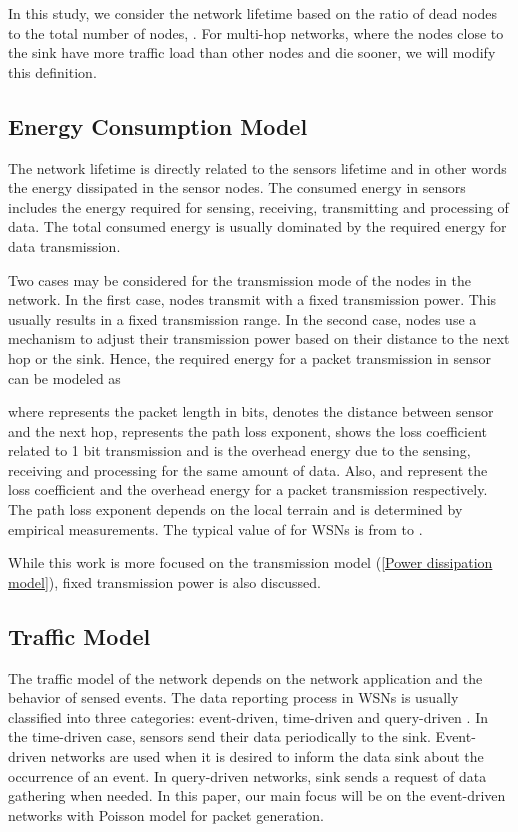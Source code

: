 \documentclass[conference]{IEEEtran}
\begin{document}
In this study, we consider the network lifetime based on the ratio
of dead nodes to the total number of nodes, . For multi-hop
networks, where the nodes close to the sink have more traffic load
than other nodes and die sooner, we will modify this definition.

\subsection{Energy Consumption Model}
The network lifetime is directly related to the sensors lifetime
and in other words the energy dissipated in the sensor nodes. The
consumed energy in sensors includes the energy required for sensing,
receiving, transmitting and processing of data. The total consumed
energy is usually dominated by the required energy for data
transmission.

Two cases may be considered for the transmission mode of the nodes
in the network. In the first case, nodes transmit with a fixed
transmission power. This usually results in a fixed transmission
range. In the second case, nodes use a mechanism to adjust their
transmission power based on their distance to the next hop or the
sink. Hence, the required energy for a packet transmission in sensor
 can be modeled as \cite{Hein_Tranmission_model_2000}

where  represents the packet length in bits,  denotes the
distance between sensor  and the next hop,  represents
the path loss exponent,  shows the loss coefficient related to
1 bit transmission and  is the overhead energy due to the
sensing, receiving and processing for the same amount of data. Also,
 and  represent the loss coefficient and the
overhead energy for a packet transmission respectively. The path
loss exponent depends on the local terrain and is determined by
empirical measurements. The typical value of  for WSNs is
from  to  \cite{Oym_ICC_2004}.

While this work is more focused on the transmission model
(\ref{Power dissipation model}), fixed transmission power is also
discussed.

\subsection{Traffic Model}
The traffic model of the network depends on the network application
and the behavior of sensed events. The data reporting process in
WSNs is usually classified into three categories: event-driven,
time-driven and query-driven \cite{Al-Karaki_Routing_Magazine2004}.
In the time-driven case, sensors send their data periodically to the
sink. Event-driven networks are used when it is desired to inform
the data sink about the occurrence of an event. In query-driven
networks, sink sends a request of data gathering when needed. In
this paper, our main focus will be on the event-driven networks with
Poisson model for packet generation.
\end{document}
